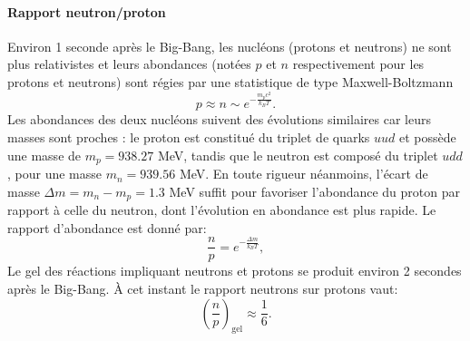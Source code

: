 \paragraph{Rapport neutron/proton}
 Environ 1 seconde après le Big-Bang, les nucléons (protons et neutrons) ne sont plus relativistes et leurs abondances (notées $p$ et $n$ respectivement pour les protons et neutrons) sont régies par une statistique de type Maxwell-Boltzmann
\begin{equation}
p\approx n \sim e^{-\frac{m_p c^2}{k_B T}}.
\end{equation}
Les abondances des deux nucléons suivent des évolutions similaires car leurs masses sont proches : le proton est constitué du triplet de quarks $uud$  et possède une masse de $m_p=938.27$ MeV, tandis que le neutron est composé du triplet $udd$, pour une masse $m_n=939.56$ MeV. En toute rigueur néanmoins, l'écart de masse $\Delta m=m_n-m_p=1.3$ MeV suffit pour favoriser l'abondance du proton par rapport à celle du neutron, dont l'évolution en abondance est plus rapide. Le rapport d'abondance est donné par:
\begin{equation}
\frac{n}{p}=e^{-\frac{\Delta m}{k_B T}},
\end{equation}
Le gel des réactions impliquant neutrons et protons se produit environ 2 secondes après le Big-Bang. À cet instant le rapport neutrons sur protons vaut:
\begin{equation}
\left(\frac{n}{p}\right)_\mathrm{gel}\approx\frac{1}{6}.
\end{equation}

